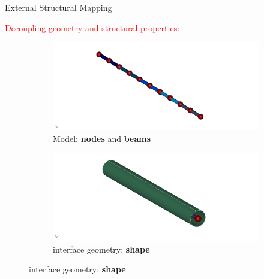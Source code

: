 \documentclass[10pt,t]{beamer}
\begin{document}
\begin{frame}{External Structural Mapping}

\textcolor{red}{Decoupling geometry and structural properties:} 

\begin{figure}
  \begin{subfigure}[t]{.486\textwidth}
    \centering
    \includegraphics[width=\linewidth]{images/beams_1a.png}
    \caption{Model: \textbf{nodes} and \textbf{beams}}
  \end{subfigure}
  \hfill
  \begin{subfigure}[t]{.486\textwidth}
    \centering
    \includegraphics[width=\linewidth]{images/interf_1a.png}
    \caption{interface geometry: \textbf{shape}}
  \end{subfigure}

  \bigskip


\end{figure}
\end{frame}
\end{document}
